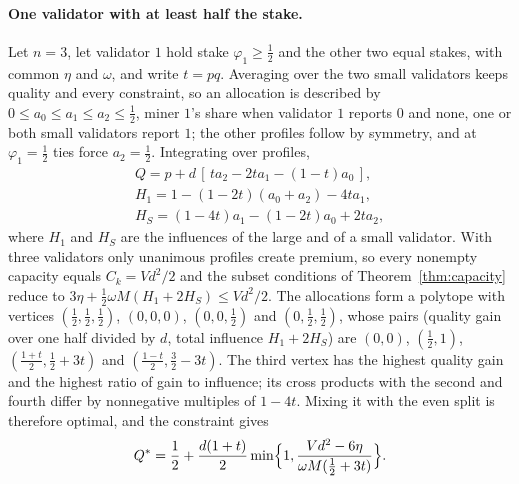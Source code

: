 \documentclass[sigconf,anonymous,review]{acmart}
\numberwithin{equation}{section}
\begin{document}
\paragraph{One validator with at least half the stake.} Let $n=3$, let
validator $1$ hold stake $\varphi_1\ge\frac12$ and the other two equal stakes,
with common $\eta$ and $\omega$, and write $t=pq$. Averaging over the two small
validators keeps quality and every constraint, so an allocation is described
by $0\le a_0\le a_1\le a_2\le\frac12$, miner $1$'s share when validator $1$
reports $0$ and none, one or both small validators report $1$; the other
profiles follow by symmetry, and at $\varphi_1=\frac12$ ties force
$a_2=\frac12$. Integrating over profiles,
\begin{gather*}
Q=p+d\,[\,ta_2-2ta_1-(1-t)a_0\,],\\
H_1=1-(1-2t)(a_0+a_2)-4ta_1,\\
H_S=(1-4t)a_1-(1-2t)a_0+2ta_2,
\end{gather*}
where $H_1$ and $H_S$ are the influences of the large and of a small validator.
With three validators only unanimous profiles create premium, so every
nonempty capacity equals $C_k=Vd^2/2$ and the subset conditions of
Theorem~\ref{thm:capacity} reduce to
$3\eta+\frac12\omega M(H_1+2H_S)\le Vd^2/2$. The allocations form a polytope
with vertices $(\frac12,\frac12,\frac12)$, $(0,0,0)$, $(0,0,\frac12)$ and
$(0,\frac12,\frac12)$, whose pairs (quality gain over one half divided by $d$,
total influence $H_1+2H_S$) are $(0,0)$, $(\frac12,1)$,
$(\frac{1+t}2,\frac12+3t)$ and $(\frac{1-t}2,\frac32-3t)$. The third vertex has
the highest quality gain and the highest ratio of gain to influence; its cross
products with the second and fourth differ by nonnegative multiples of $1-4t$.
Mixing it with the even split is therefore optimal, and the constraint gives
\[
Q^*=\frac12+\frac{d(1+t)}2\min\Bigl\{1,\frac{Vd^2-6\eta}{\omega M(\frac12+3t)}\Bigr\}.
\]
\end{document}
